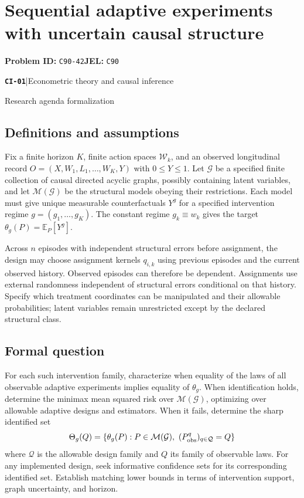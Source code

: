 \documentclass[11pt,a4paper]{article}
\newcommand{\E}{\mathbb E}
\newcommand{\entrymeta}[3]{{\sffamily\small\color{muted}\textbf{\texttt{#1}}\quad|\quad #2\par #3\par}}
\begin{document}
\section*{Sequential adaptive experiments with uncertain causal structure}
\textbf{Problem ID:} \texttt{C90-42}\quad \textbf{JEL:} \texttt{C90}\par
\label{problem:OP-0480}
\label{beyond:CI-01}
\entrymeta{CI-01}{Econometric theory and causal inference}{Research agenda formalization}
\subsection*{Definitions and assumptions}
Fix a finite horizon $K$, finite action spaces $\mathcal W_k$, and an observed longitudinal record $O=(X,W_1,L_1,\ldots,W_K,Y)$ with $0\leq Y\leq1$. Let $\mathcal G$ be a specified finite collection of causal directed acyclic graphs, possibly containing latent variables, and let $\mathcal M(\mathcal G)$ be the structural models obeying their restrictions. Each model must give unique measurable counterfactuals $Y^g$ for a specified intervention regime $g=(g_1,\ldots,g_K)$. The constant regime $g_k\equiv w_k$ gives the target $\theta_g(P)=\E_P[Y^g]$.

Across $n$ episodes with independent structural errors before assignment, the design may choose assignment kernels $q_{i,k}$ using previous episodes and the current observed history. Observed episodes can therefore be dependent. Assignments use external randomness independent of structural errors conditional on that history. Specify which treatment coordinates can be manipulated and their allowable probabilities; latent variables remain unrestricted except by the declared structural class.
\subsection*{Formal question}
For each such intervention family, characterize when equality of the laws of all observable adaptive experiments implies equality of $\theta_g$. When identification holds, determine the minimax mean squared risk over $\mathcal M(\mathcal G)$, optimizing over allowable adaptive designs and estimators. When it fails, determine the sharp identified set
\[
\Theta_g(Q)=\{\theta_g(P):P\in\mathcal M(\mathcal G),\
               (P_{\rm obs}^{q})_{q\in\mathcal Q}=Q\}
\]
where $\mathcal Q$ is the allowable design family and $Q$ its family of observable laws. For any implemented design, seek informative confidence sets for its corresponding identified set. Establish matching lower bounds in terms of intervention support, graph uncertainty, and horizon.
\end{document}
